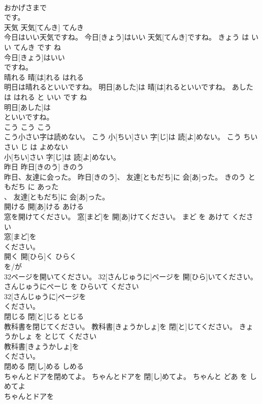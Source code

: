 \documentclass[8pt]{extreport}
\begin{document}
\begin{CJK}{UTF8}{min}
\\	おかげさまで
\\	です。		
\\	天気	天気[てんき]	てんき	
\\	今日はいい天気ですね。	今日[きょう]はいい 天気[てんき]ですね。	きょう は いい てんき です ね	
\\	今日[きょう]はいい
\\	ですね。		
\\	晴れる	晴[は]れる	はれる	
\\	明日は晴れるといいですね。	明日[あした]は 晴[は]れるといいですね。	あした は はれる と いい です ね	
\\	明日[あした]は
\\	といいですね。		
\\	こう	こう	こう	
\\	こう小さい字は読めない。	こう 小[ちい]さい 字[じ]は 読[よ]めない。	こう ちいさい じ は よめない	
\\	小[ちい]さい 字[じ]は 読[よ]めない。		
\\	昨日	昨日[きのう]	きのう	
\\	昨日、友達に会った。	昨日[きのう]、 友達[ともだち]に 会[あ]った。	きのう ともだち に あった	
\\	、 友達[ともだち]に 会[あ]った。		
\\	開ける	開[あ]ける	あける	
\\	窓を開けてください。	窓[まど]を 開[あ]けてください。	まど を あけて ください	
\\	窓[まど]を
\\	ください。		
\\	開く	開[ひら]く	ひらく	
\\	を/が		
\\	32ページを開いてください。	32[さんじゅうに]ページを 開[ひら]いてください。	さんじゅうにぺーじ を ひらいて ください	
\\	32[さんじゅうに]ページを
\\	ください。		
\\	閉じる	閉[と]じる	とじる	
\\	教科書を閉じてください。	教科書[きょうかしょ]を 閉[と]じてください。	きょうかしょ を とじて ください	
\\	教科書[きょうかしょ]を
\\	ください。		
\\	閉める	閉[し]める	しめる	
\\	ちゃんとドアを閉めてよ。	ちゃんとドアを 閉[し]めてよ。	ちゃんと どあ を しめてよ	
\\	ちゃんとドアを

\end{CJK}
\end{document}

